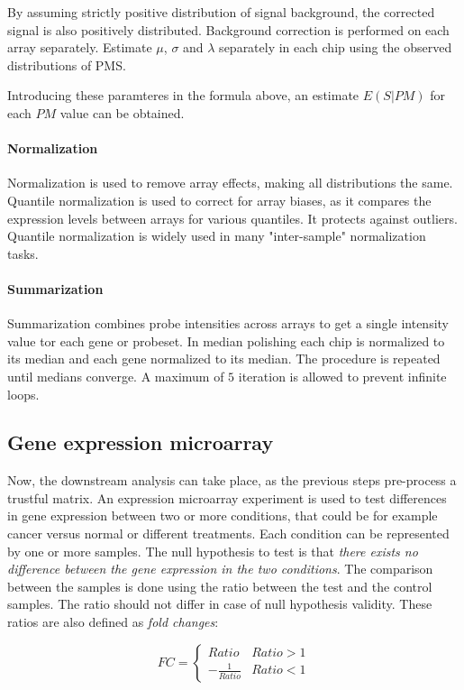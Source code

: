 			
			By assuming strictly positive distribution of signal background, the corrected signal is also positively distributed.
			Background correction is performed on each array separately.
			Estimate $\mu$, $\sigma$ and $\lambda$ separately in each chip using the observed distributions of PMS.

			
			Introducing these paramteres in the formula above, an estimate $E(S|PM)$ for each $PM$ value can be obtained.

			\paragraph{Normalization}
			Normalization is used to remove array effects, making all distributions the same.
			Quantile normalization is used to correct for array biases, as it compares the expression levels between arrays for various quantiles.
			It protects against outliers.
			Quantile normalization is widely used in many "inter-sample" normalization tasks.

			\paragraph{Summarization}
			Summarization combines probe intensities across arrays to get a single intensity value tor each gene or probeset.
			In median polishing each chip is normalized to its median and each gene normalized to its median.
			The procedure is repeated until medians converge.
			A maximum of $5$ iteration is allowed to prevent infinite loops.

	\subsection{Gene expression microarray}
	Now, the downstream analysis can take place, as the previous steps pre-process a trustful matrix.
	An expression microarray experiment is used to test differences in gene expression between two or more conditions, that could be for example cancer versus normal or different treatments.
	Each condition can be represented by one or more samples.
	The null hypothesis to test is that \textit{there exists no difference between the gene expression in the two conditions}.
	The comparison between the samples is done using the ratio between the test and the control samples.
	The ratio should not differ in case of null hypothesis validity.
	These ratios are also defined as \textit{fold changes}:

	$$FC = \begin{cases}Ratio & Ratio>1\\-\frac{1}{Ratio} & Ratio <1\end{cases}$$
	
